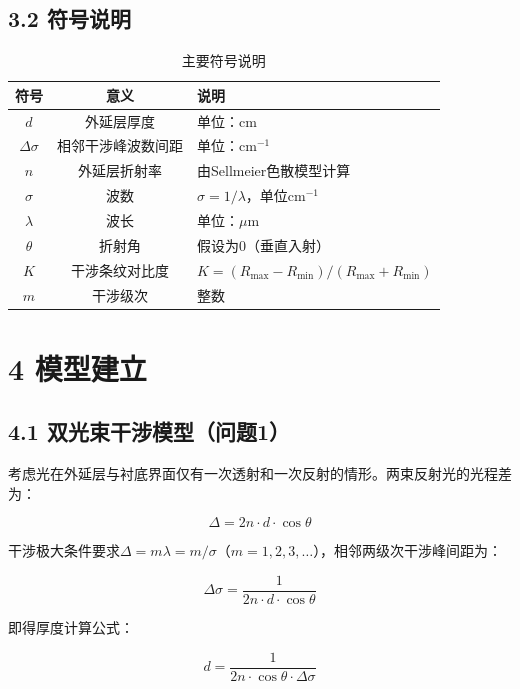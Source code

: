 \documentclass[withoutpreface]{cumcmthesis}
\begin{document}
\subsection{3.2 符号说明}
\begin{table}[!htbp]
\centering
\caption{主要符号说明}
\begin{tabular}{ccp{8cm}}
\toprule
符号 & 意义 & 说明 \\
\midrule
$d$ & 外延层厚度 & 单位：cm \\
$\Delta\sigma$ & 相邻干涉峰波数间距 & 单位：cm$^{-1}$ \\
$n$ & 外延层折射率 & 由Sellmeier色散模型计算 \\
$\sigma$ & 波数 & $\sigma=1/\lambda$，单位cm$^{-1}$ \\
$\lambda$ & 波长 & 单位：$\mu$m \\
$\theta$ & 折射角 & 假设为0（垂直入射） \\
$K$ & 干涉条纹对比度 & $K = (R_{\max}-R_{\min})/(R_{\max}+R_{\min})$ \\
$m$ & 干涉级次 & 整数 \\
\bottomrule
\end{tabular}
\end{table}

\section{4 模型建立}

\subsection{4.1 双光束干涉模型（问题1）}
考虑光在外延层与衬底界面仅有一次透射和一次反射的情形。两束反射光的光程差为：

\begin{equation}
\Delta = 2n \cdot d \cdot \cos\theta
\end{equation}

干涉极大条件要求$\Delta = m\lambda = m/\sigma$（$m=1,2,3,\dots$），相邻两级次干涉峰间距为：

\begin{equation}
\boxed{\Delta\sigma = \frac{1}{2n\cdot d\cdot\cos\theta}}
\end{equation}

即得厚度计算公式：

\begin{equation}
\boxed{d = \frac{1}{2n\cdot\cos\theta\cdot\Delta\sigma}}
\end{equation}
\end{document}
